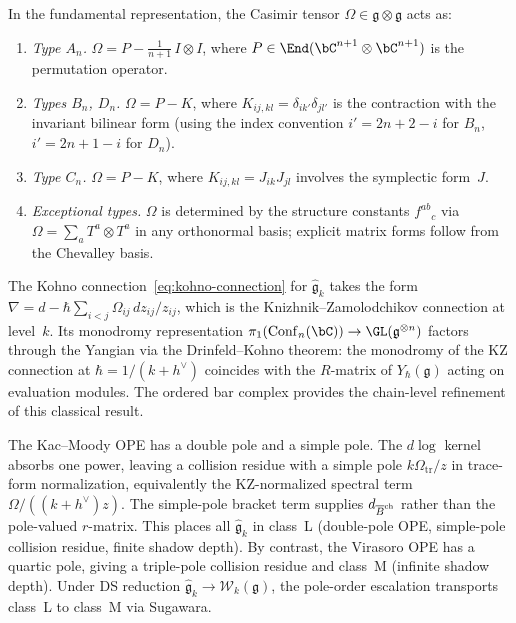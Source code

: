 \begin{remark}
\label{rem:casimir-types}
In the fundamental representation, the Casimir tensor
$\Omega\in\mathfrak{g}\otimes\mathfrak{g}$ acts as:
\begin{enumerate}[label=\textup{(\alph*)}]
\item \emph{Type $A_n$.}\enspace
$\Omega = P - \frac{1}{n+1}\,I\otimes I$,
where $P\in\End(\bC^{n+1}\otimes\bC^{n+1})$ is the
permutation operator.
\item \emph{Types $B_n$, $D_n$.}\enspace
$\Omega = P - K$,
where $K_{ij,kl} = \delta_{ik'}\delta_{jl'}$
is the contraction with the invariant bilinear form
(using the index convention $i' = 2n+2-i$ for $B_n$,
$i' = 2n+1-i$ for $D_n$).
\item \emph{Type $C_n$.}\enspace
$\Omega = P - K$,
where $K_{ij,kl} = J_{ik}J_{jl}$ involves the
symplectic form~$J$.
\item \emph{Exceptional types.}\enspace
$\Omega$ is determined by the structure constants
$f^{ab}{}_{c}$ via
$\Omega = \sum_a T^a\otimes T^a$
in any orthonormal basis; explicit matrix forms
follow from the Chevalley basis.
\end{enumerate}
\end{remark}

\begin{remark}
\label{rem:km-drinfeld-kohno}
The Kohno connection~\eqref{eq:kohno-connection} for
$\widehat{\mathfrak{g}}_k$ takes the form
$\nabla = d - \hbar\sum_{i<j}\Omega_{ij}\,dz_{ij}/z_{ij}$,
which is the Knizhnik--Zamolodchikov connection at level~$k$.
Its monodromy representation $\pi_1(\mathrm{Conf}_n(\bC))
\to\GL(\mathfrak{g}^{\otimes n})$ factors through the
Yangian via the Drinfeld--Kohno theorem: the monodromy of
the KZ connection at $\hbar = 1/(k+h^\vee)$ coincides with
the $R$-matrix of $Y_\hbar(\mathfrak{g})$ acting on evaluation
modules. The ordered bar complex provides the chain-level
refinement of this classical result.
\end{remark}

\begin{remark}
\label{rem:km-pole-dichotomy}
The Kac--Moody OPE has a double pole and a simple pole.
The $d\log$ kernel absorbs one power, leaving a collision
residue with a simple pole $k\Omega_{\mathrm{tr}}/z$ in trace-form
normalization, equivalently the KZ-normalized spectral term
$\Omega/((k+h^\vee)z)$. The simple-pole bracket term supplies
$d_{\overline{B}^{\mathrm{ch}}}$ rather than the pole-valued $r$-matrix. This
places all $\widehat{\mathfrak{g}}_k$ in class~L (double-pole
OPE, simple-pole collision residue, finite shadow depth).
By contrast, the Virasoro OPE has a quartic pole, giving
a triple-pole collision residue and class~M (infinite shadow
depth). Under DS reduction
$\widehat{\mathfrak{g}}_k\to\mathcal{W}_k(\mathfrak{g})$,
the pole-order escalation transports class~L to class~M
via Sugawara.
\end{remark}

